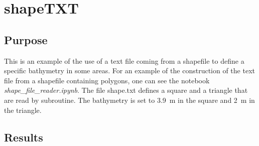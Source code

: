 \chapter{shapeTXT}

\section{Purpose}
This is an example of the use of a text file coming from a shapefile to define
a specific bathymetry in some areas.
For an example of the construction of the text file from a shapefile containing
polygons, one can see the notebook {\it shape\_file\_reader.ipynb}.
The file shape.txt defines a square and a triangle that are read by
 subroutine.
The bathymetry is set to 3.9~m in the square and 2~m in the triangle. 

\section{Results}

\begin{figure}[htbp]
\end{figure}
